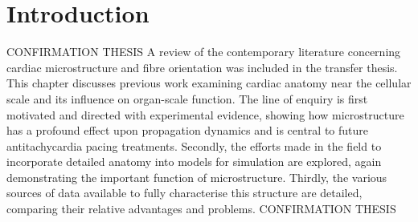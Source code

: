 
\section{Introduction}
\label{sec:review:introduction}
CONFIRMATION THESIS
A review of the contemporary literature concerning cardiac microstructure and fibre orientation was included in the transfer thesis. This chapter discusses previous work examining cardiac anatomy near the cellular scale and its influence on organ-scale function. The line of enquiry is first motivated and directed with experimental evidence, showing how microstructure has a profound effect upon propagation dynamics and is central to future antitachycardia pacing treatments. Secondly, the efforts made in the field to incorporate detailed anatomy into models for simulation are explored, again demonstrating the important function of microstructure. Thirdly, the various sources of data available to fully characterise this structure are detailed, comparing their relative advantages and problems.
CONFIRMATION THESIS

